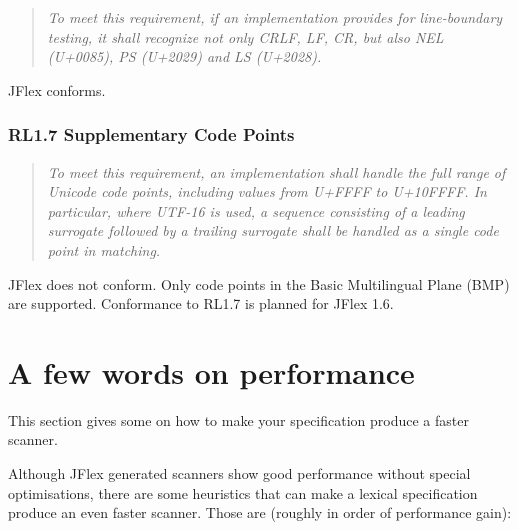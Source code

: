 \documentclass[11pt]{scrartcl}
\newcommand{\nextver}{1.6}
\begin{document}
\begin{quote}
\emph{To meet this requirement, if an implementation provides for
line-boundary testing, it shall recognize not only CRLF, LF, CR, but
also NEL (U+0085), PS (U+2029) and LS (U+2028).}
\end{quote}

JFlex conforms.

\subsubsection*{RL1.7 Supplementary Code Points}

\begin{quote}
\emph{To meet this requirement, an implementation shall handle the full
range of Unicode code points, including values from U+FFFF to U+10FFFF.
In particular, where UTF-16 is used, a sequence consisting of a leading
surrogate followed by a trailing surrogate shall be handled as a single
code point in matching.}
\end{quote}

JFlex does not conform.  Only code points in the Basic Multilingual
Plane (BMP) are supported.  Conformance to RL1.7 is planned for JFlex
\nextver.


\section{A few words on performance}
\label{PerformanceTips}\label{performance}

This section gives some  on how to make
your specification produce a faster scanner. 

Although JFlex generated scanners show good performance without
special optimisations, there are some heuristics that can make a
lexical specification produce an even faster scanner. Those are
(roughly in order of performance gain):
 
\end{document}
